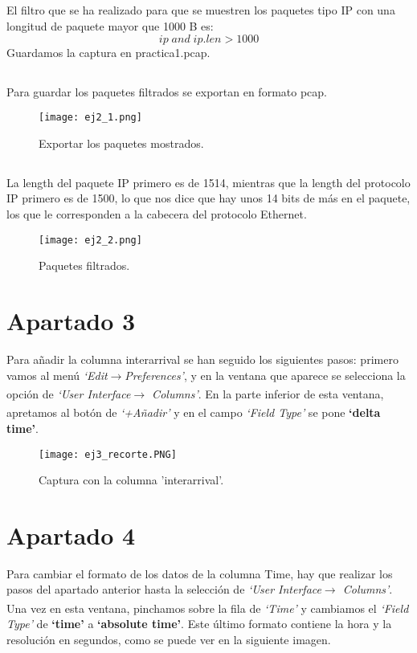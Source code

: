 \documentclass[12pt]{article}
\begin{document}
\subsection{}
El filtro que se ha realizado para que se muestren los paquetes tipo IP con una longitud de paquete mayor que 1000 B es:
$$ip\; and\; ip.len > 1000$$
Guardamos la captura en practica1.pcap.

\subsection{}
Para guardar los paquetes filtrados se exportan en formato pcap.
\begin{figure}[h!]
    \centering
    \texttt{[image: ej2\_1.png]}
    \caption{Exportar los paquetes mostrados.}
\end{figure}

\subsection{}
La length del paquete IP primero es de 1514, mientras que la length del protocolo IP primero es de 1500, lo que nos dice que hay unos 14 bits de más en el paquete, los que le corresponden a la cabecera del protocolo Ethernet.
\begin{figure}[h!]
    \centering
    \texttt{[image: ej2\_2.png]}
    \caption{Paquetes filtrados.}
\end{figure}
\newpage
\section{Apartado 3}
Para añadir la columna interarrival se han seguido los siguientes pasos: primero vamos al menú \textit{‘Edit$\xrightarrow[]{}$Preferences’}, y en la ventana que aparece se selecciona la opción de \textit{‘User Interface$\xrightarrow[]{}$ Columns’}. En la parte inferior de esta ventana, apretamos al botón de \textit{‘+Añadir’} y en el campo \textit{‘Field Type’} se pone \textbf{‘delta time’}. \\

\begin{figure}[h!]
    \centering
    \texttt{[image: ej3\_recorte.PNG]}
    \caption{Captura con la columna 'interarrival'.}
\end{figure}

\section{Apartado 4}
Para cambiar el formato de los datos de la columna Time, hay que realizar los pasos del apartado anterior hasta la selección de \textit{‘User Interface$\xrightarrow[]{}$ Columns’}. Una vez en esta ventana, pinchamos sobre la fila de \textit{‘Time’} y cambiamos el \textit{‘Field Type’} de \textbf{‘time’} a \textbf{‘absolute time’}.
\newline
\hspace*{0.5 cm}Este último formato contiene la hora y la resolución en segundos, como se puede ver en la siguiente imagen.
\newline
\end{document}
